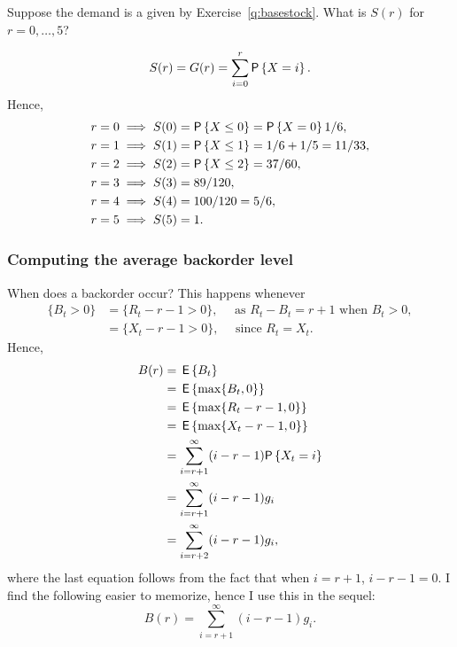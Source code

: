 \begin{question}\label{q:basestock}
  Suppose the demand is a given by  Exercise~\ref{q:basestock}.
What is $S(r)$ for $r=0, \ldots, 5$?
\end{question}
\begin{solution}
  \begin{equation*}
    S(r) = G(r) = \sum_{i=0}^r \P{X = i}.
  \end{equation*}
Hence,
\begin{align*}
  r &= 0 \implies S(0) = \P{X \leq 0} = \P{X=0}1/6, \\
  r &= 1 \implies S(1) = \P{X \leq 1} = 1/6 + 1/5 = 11/33, \\
  r &= 2 \implies S(2) = \P{X \leq 2} = 37/60,\\
  r &= 3 \implies S(3) = 89/120, \\
  r &= 4 \implies S(4) = 100/120 = 5/6, \\
  r &= 5 \implies S(5) = 1.
\end{align*}
\end{solution}

\subsubsection{Computing the average backorder level}


When does a backorder occur? This happens whenever
\begin{equation}
  \label{eq:11}
  \begin{split}
   \{B_t > 0\} 
&= \{R_t - r-1>0\}, \quad \text{ as } R_t - B_t = r+1\text{ when } B_t >0, \\
&= \{X_t - r-1>0\},\quad \text{ since  } R_t  = X_t.
  \end{split}
\end{equation}
Hence,
\begin{equation*}
   \begin{split}
     B(r) 
   &= \E{B_t} \\
   &= \E{\max\{B_t, 0\}} \\
   &= \E{\max\{R_t - r - 1, 0\}} \\
   &= \E{\max\{X_t - r - 1, 0\}} \\
   &= \sum_{i=r+1}^\infty (i- r -1)\P{X_t = i}\\
   &= \sum_{i=r+1}^\infty (i- r -1)g_i \\
   &= \sum_{i=r+2}^\infty (i- r -1)g_i,
     \end{split}
\end{equation*}
where the last equation follows from the fact that when $i=r+1$,
$i-r-1 =0$. I find the following easier to memorize, hence I use this
in the sequel:
\begin{equation}
  \label{eq:12}
   B(r)  = \sum_{i=r+1}^\infty (i- r -1)g_i.
\end{equation}

